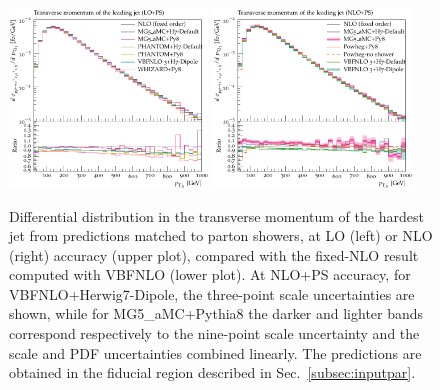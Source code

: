 \documentclass[twocolumn,epjc3]{svjour3} %
\newlength{\width}
\begin{document}
\begin{figure}[hbt]
\centering
\includegraphics[width=0.47\textwidth]{figures/LOPS/pT_j1.pdf}
\includegraphics[width=0.47\textwidth]{figures/NLOPS/pT_j1.pdf}
\caption{Differential distribution in the
transverse momentum of the hardest jet
from predictions matched to parton showers, at LO (left) or NLO (right) accuracy (upper plot), compared with the fixed-NLO result computed with {\sc VBFNLO} (lower plot). At NLO+PS accuracy, for
    {\sc VBFNLO}+{\sc Herwig7-Dipole}, the three-point scale uncertainties are shown, while for {\sc MG5\_aMC}+{\sc Pythia8} the darker and lighter bands correspond
    respectively to the nine-point scale uncertainty and the scale and PDF uncertainties combined linearly.
    The predictions are obtained in the fiducial region described in Sec.~\protect\ref{subsec:inputpar}.}
\label{fig:PSpt1}
\end{figure}
\end{document}
